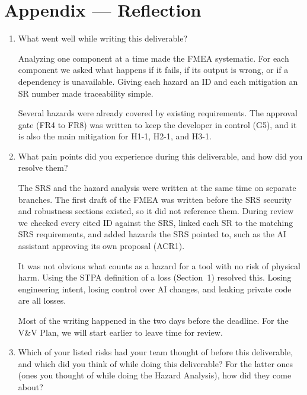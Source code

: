 \documentclass{article}
\begin{document}
\newpage{}

\section{Appendix --- Reflection}



\begin{enumerate}
    \item What went well while writing this deliverable?

    Analyzing one component at a time made the FMEA systematic. For each
    component we asked what happens if it fails, if its output is wrong, or if
    a dependency is unavailable. Giving each hazard an ID and each mitigation
    an SR number made traceability simple.

    Several hazards were already covered by existing requirements. The
    approval gate (FR4 to FR8) was written to keep the developer in control
    (G5), and it is also the main mitigation for H1-1, H2-1, and H3-1.

    \item What pain points did you experience during this deliverable, and how
    did you resolve them?

    The SRS and the hazard analysis were written at the same time on separate
    branches. The first draft of the FMEA was written before the SRS security
    and robustness sections existed, so it did not reference them. During
    review we checked every cited ID against the SRS, linked each SR to the
    matching SRS requirements, and added hazards the SRS pointed to, such as
    the AI assistant approving its own proposal (ACR1).

    It was not obvious what counts as a hazard for a tool with no risk of
    physical harm. Using the STPA definition of a loss (Section~1) resolved
    this. Losing engineering intent, losing control over AI changes, and
    leaking private code are all losses.

    Most of the writing happened in the two days before the deadline. For the
    V\&V Plan, we will start earlier to leave time for review.

    \item Which of your listed risks had your team thought of before this
    deliverable, and which did you think of while doing this deliverable? For
    the latter ones (ones you thought of while doing the Hazard Analysis), how
    did they come about?


\end{enumerate}
\end{document}
